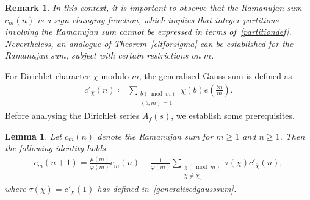 \documentclass[12pt, oneside,reqno]{amsart}
\numberwithin{equation}{section}
\newtheorem{lemma}[theorem]{Lemma}
\newtheorem{remark}[theorem]{Remark}
\begin{document}
\begin{remark}
In this context, it is important to observe that the Ramanujan sum $c_m(n)$ is a sign-changing function, which implies that integer partitions involving the Ramanujan sum cannot be expressed in terms of~\eqref{partitiondef}. Nevertheless, an analogue of Theorem~\ref{cltforsigma} can be established for the Ramanujan sum, subject with certain restrictions on $m$.

\end{remark}

For Dirichlet character $\chi$ modulo $m$, the generalised Gauss sum is defined as
\begin{align}\label{generalizedgausssum}
c'_{\chi}(n) 
\coloneqq \sum_{\substack{b(\bmod{m})\\(b,m)=1}}\chi(b)e\left(\frac{bn}{m}\right).
\end{align}
Before analysing the Dirichlet series $A_{f}(s)$, we establish some prerequisites.

\begin{lemma}\label{shiftedramanujansumformula}
Let $c_m(n)$ denote the Ramanujan sum for $m\geq 1$ and $n\geq 1$. Then the following identity holds
\begin{align*}
c_m(n+1)
=\frac{\mu(m)}{\varphi(m)}c_m(n)+\frac{1}{\varphi(m)}\sum_{\substack{\chi(\bmod{m})\\ \chi\ne\chi_0}}\tau(\chi)c'_{\bar{\chi}}(n),
\end{align*}
where $\tau(\chi)=c'_{\chi}(1)$ has defined in~\eqref{generalizedgausssum}. %
\end{lemma}
\end{document}
